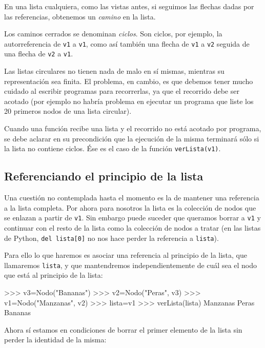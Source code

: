 En una lista cualquiera, como las vistas antes, si seguimos las flechas
dadas por las referencias, obtenemos un {\it camino} en la lista.

Los caminos cerrados se denominan {\it ciclos}. Son ciclos, por ejemplo, la
autorreferencia de \lstinline|v1| a \lstinline|v1|, como así también una
flecha de \lstinline|v1| a \lstinline|v2| seguida de una flecha de
\lstinline|v2| a \lstinline|v1|.

\begin{atencion}
Las listas circulares no tienen nada de malo en sí mismas,
mientras su representación sea finita. El problema, en cambio, es que debemos tener
mucho cuidado al escribir programas para recorrerlas, ya que el recorrido
debe ser acotado (por ejemplo no habría problema en ejecutar un programa
que liste los 20 primeros nodos de una lista circular).

Cuando una función recibe una lista y el recorrido no está acotado
por programa, se debe aclarar en su precondición que la ejecución de la misma terminará
sólo si la lista no contiene ciclos. Ése es el caso de la función
\lstinline|verLista(v1)|.
\end{atencion}

\subsection{Referenciando el principio de la lista}

Una cuestión no contemplada hasta el momento es la de mantener una referencia
a la lista completa. Por ahora para nosotros la lista es la colección de nodos
que se enlazan a partir de \lstinline|v1|. Sin embargo puede suceder que queramos
borrar a \lstinline|v1| y continuar con el resto de la lista como la colección de
nodos a tratar (en las listas de Python, \lstinline|del lista[0]| no nos hace perder
la referencia a \lstinline|lista|).

Para ello lo que haremos es asociar una referencia al principio de la lista,
que llamaremos \lstinline|lista|, y que mantendremos independientemente de cuál sea
el nodo que está al principio de la lista:

\begin{codigo-python-sn}
>>> v3=Nodo("Bananas")
>>> v2=Nodo("Peras", v3)
>>> v1=Nodo("Manzanas", v2)
>>> lista=v1
>>> verLista(lista)
Manzanas
Peras
Bananas
\end{codigo-python-sn}

Ahora sí estamos en condiciones de borrar el primer elemento de la lista
sin perder la identidad de la misma:

